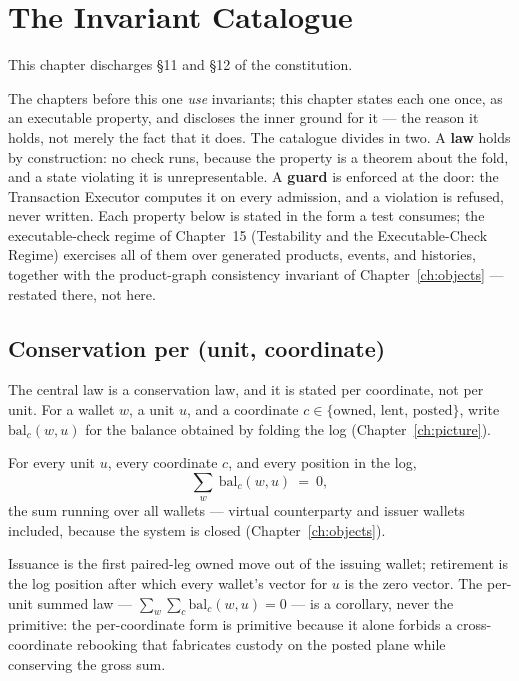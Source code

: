 \section{The Invariant Catalogue}\label{ch:invariants}

This chapter discharges \S 11 and \S 12 of the constitution.

The chapters before this one \emph{use} invariants; this chapter states each one
once, as an executable property, and discloses the inner ground for it --- the
reason it holds, not merely the fact that it does. The catalogue divides in two.
A \textbf{law} holds by construction: no check runs, because the property is a
theorem about the fold, and a state violating it is unrepresentable. A
\textbf{guard} is enforced at the door: the Transaction Executor computes it on
every admission, and a violation is refused, never written. Each property below
is stated in the form a test consumes; the executable-check regime of Chapter~15
(Testability and the Executable-Check Regime) exercises all of them over
generated products, events, and histories, together with the product-graph
consistency invariant of Chapter~\ref{ch:objects} --- restated there, not here.

\subsection{Conservation per (unit, coordinate)}

The central law is a conservation law, and it is stated per coordinate, not per
unit. For a wallet $w$, a unit $u$, and a coordinate $c\in\{\text{owned, lent,
posted}\}$, write $\mathrm{bal}_c(w,u)$ for the balance obtained by folding the
log (Chapter~\ref{ch:picture}).

\begin{theorem}[Conservation]\label{thm:conservation}
For every unit $u$, every coordinate $c$, and every position in the log,
\[
\sum_{w}\ \mathrm{bal}_c(w,u)\ =\ 0,
\]
the sum running over all wallets --- virtual counterparty and issuer wallets
included, because the system is closed (Chapter~\ref{ch:objects}).
\end{theorem}

Issuance is the first paired-leg owned move out of the issuing wallet;
retirement is the log position after which every wallet's vector for $u$ is the
zero vector. The per-unit summed law --- $\sum_w\sum_c \mathrm{bal}_c(w,u)=0$ ---
is a corollary, never the primitive: the per-coordinate form is primitive
because it alone forbids a cross-coordinate rebooking that fabricates custody on
the posted plane while conserving the gross sum.

